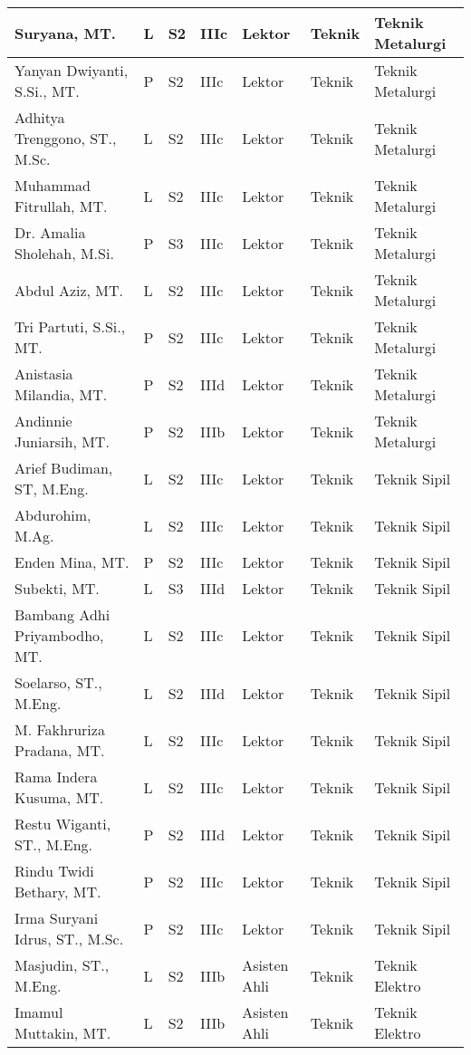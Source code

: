 \documentclass[
]{book}
\begin{document}
\begin{longtable}{l|l|l|l|l|l|l}
\hline
Suryana, MT. & L & S2 & IIIc & Lektor & Teknik & Teknik Metalurgi\\
\hline
Yanyan Dwiyanti, S.Si., MT. & P & S2 & IIIc & Lektor & Teknik & Teknik Metalurgi\\
\hline
Adhitya Trenggono, ST., M.Sc. & L & S2 & IIIc & Lektor & Teknik & Teknik Metalurgi\\
\hline
Muhammad Fitrullah, MT. & L & S2 & IIIc & Lektor & Teknik & Teknik Metalurgi\\
\hline
Dr. Amalia Sholehah, M.Si. & P & S3 & IIIc & Lektor & Teknik & Teknik Metalurgi\\
\hline
Abdul Aziz, MT. & L & S2 & IIIc & Lektor & Teknik & Teknik Metalurgi\\
\hline
Tri Partuti, S.Si., MT. & P & S2 & IIIc & Lektor & Teknik & Teknik Metalurgi\\
\hline
Anistasia Milandia, MT. & P & S2 & IIId & Lektor & Teknik & Teknik Metalurgi\\
\hline
Andinnie Juniarsih, MT. & P & S2 & IIIb & Lektor & Teknik & Teknik Metalurgi\\
\hline
Arief Budiman, ST, M.Eng. & L & S2 & IIIc & Lektor & Teknik & Teknik Sipil\\
\hline
Abdurohim, M.Ag. & L & S2 & IIIc & Lektor & Teknik & Teknik Sipil\\
\hline
Enden Mina, MT. & P & S2 & IIIc & Lektor & Teknik & Teknik Sipil\\
\hline
Subekti, MT. & L & S3 & IIId & Lektor & Teknik & Teknik Sipil\\
\hline
Bambang Adhi Priyambodho, MT. & L & S2 & IIIc & Lektor & Teknik & Teknik Sipil\\
\hline
Soelarso, ST., M.Eng. & L & S2 & IIId & Lektor & Teknik & Teknik Sipil\\
\hline
M. Fakhruriza Pradana, MT. & L & S2 & IIIc & Lektor & Teknik & Teknik Sipil\\
\hline
Rama Indera Kusuma, MT. & L & S2 & IIIc & Lektor & Teknik & Teknik Sipil\\
\hline
Restu Wiganti, ST., M.Eng. & P & S2 & IIId & Lektor & Teknik & Teknik Sipil\\
\hline
Rindu Twidi Bethary, MT. & P & S2 & IIIc & Lektor & Teknik & Teknik Sipil\\
\hline
Irma Suryani Idrus, ST., M.Sc. & P & S2 & IIIc & Lektor & Teknik & Teknik Sipil\\
\hline
Masjudin, ST., M.Eng. & L & S2 & IIIb & Asisten Ahli & Teknik & Teknik Elektro\\
\hline
Imamul Muttakin, MT. & L & S2 & IIIb & Asisten Ahli & Teknik & Teknik Elektro\\

\end{longtable}
\end{document}
